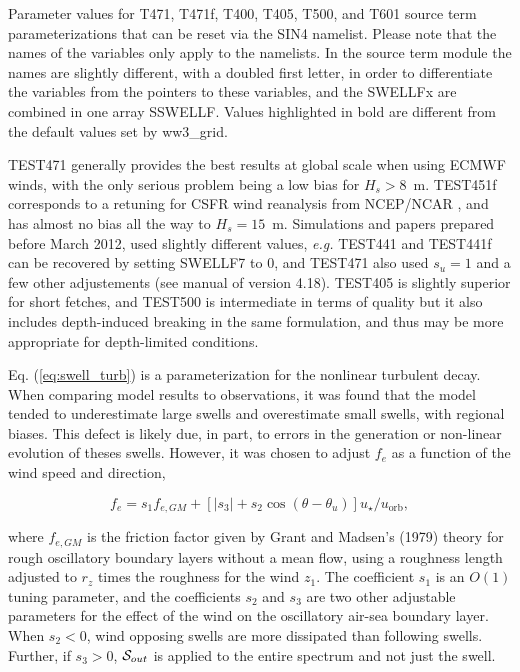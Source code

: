 \begin{landscape}
\begin{table}
\begin{center}
 \end{center}
\caption{Parameter values for T471, T471f, T400, T405, T500, and T601 source 
term parameterizations that can be reset via the {\F SIN4} namelist. 
Please note that the names of the variables only apply to the namelists. In the
source term module the names are slightly different, with a doubled first
letter, in order to differentiate the variables from the pointers to these
variables, and the SWELLFx are combined in one array SSWELLF. Values highlighted in bold are
different from the default values set by ww3\_grid.} \label{tab:ST4_parSIN}
\end{table}
\end{landscape}

TEST471 generally provides the best results at global scale when using ECMWF winds,
with the only serious problem being a low bias for $H_s > 8$~m.  TEST451f
corresponds to a retuning for CSFR wind reanalysis from NCEP/NCAR
\citep{art:CFSRR10}, and has almost no bias all the way to $H_s =
15$~m. Simulations and papers prepared before March 2012, used slightly
different values, {\it e.g.} TEST441 and TEST441f can be recovered by setting SWELLF7 to 0, and 
TEST471 also used $s_u=1$ and a few other adjustements (see manual of version 4.18).
TEST405 is slightly superior for short fetches, and TEST500 is intermediate in
terms of quality but it also includes depth-induced breaking in the same
formulation, and thus may be more appropriate for depth-limited conditions.


Eq. (\ref{eq:swell_turb}) is a parameterization for the
nonlinear turbulent decay. When comparing model results to observations, it
was found that the model tended to underestimate large swells and overestimate
small swells, with regional biases. This defect is likely due, in part, to
errors in the generation or non-linear evolution of theses swells. However, it
was chosen to adjust $f_e$ as a function of the wind speed and direction,

\begin{equation}
f_e = s_1 f_{e,GM} + \left[\left|s_3\right| + s_2 \cos
(\theta-\theta_u)\right]u_\star / u_{\mathrm{orb}},\label{fevar}
\end{equation}

\noindent 
where $f_{e,GM}$ is the friction factor given by Grant and Madsen's
(1979)\nocite{art:GM79} theory for rough oscillatory boundary layers without a
mean flow, using a roughness length adjusted to $r_z$ times the roughness for
the wind $z_1$. The coefficient $s_1$ is an $O(1)$ tuning parameter, and the
coefficients $s_2$ and $s_3$ are two other adjustable parameters for the
effect of the wind on the oscillatory air-sea boundary layer. When $s_2 < 0$,
wind opposing swells are more dissipated than following swells. Further, if
$s_3 > 0$, ${\cal S}_{out}$ is applied to the entire spectrum and not just the
swell.

